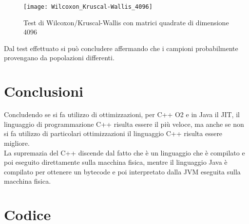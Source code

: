 \begin{figure}[!htbp]
  \texttt{[image: Wilcoxon\_Kruscal-Wallis\_4096]}
  \caption{Test di Wilcoxon/Kruscal-Wallis con matrici quadrate di dimensione 4096}
  \label{Wilcoxon_Kruscal-Wallis_4096}
\end{figure}

Dal test effettuato si può concludere affermando che i campioni probabilmente
provengano da popolazioni differenti.

\clearpage

\section{Conclusioni}
Concludendo se si fa utilizzo di ottimizzazioni, per C++ O2 e in Java il JIT,
il linguaggio di programmazione C++ risulta essere il più veloce, ma anche se non si fa
utilizzo di particolari ottimizzazioni il linguaggio C++ risulta essere migliore.\\
La supremazia del C++ discende dal fatto che è un linguaggio che è compilato e poi
eseguito direttamente sulla macchina fisica, mentre il linguaggio Java è compilato
per ottenere un bytecode e poi interpretato dalla JVM eseguita sulla macchina fisica.
\section{Codice}


